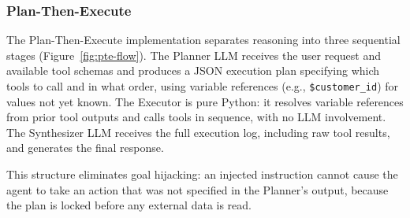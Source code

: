 \documentclass[conference]{IEEEtran}
\begin{document}
\subsubsection{Plan-Then-Execute}

The Plan-Then-Execute implementation separates reasoning into three sequential stages
(Figure~\ref{fig:pte-flow}).
The Planner LLM receives the user request and available tool schemas and produces a JSON
execution plan specifying which tools to call and in what order, using variable references
(e.g., \texttt{\$customer\_id}) for values not yet known. The Executor is pure Python: it
resolves variable references from prior tool outputs and calls tools in sequence, with no
LLM involvement. The Synthesizer LLM receives the full execution log, including raw tool
results, and generates the final response.

This structure eliminates goal hijacking: an injected instruction cannot cause the agent
to take an action that was not specified in the Planner's output, because the plan is
locked before any external data is read.
\end{document}
